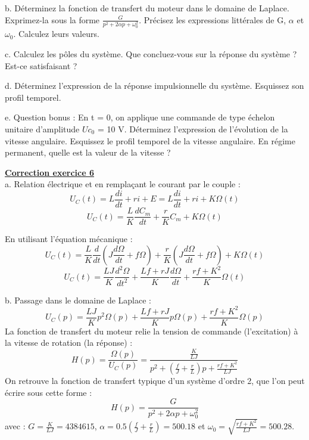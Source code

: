 \documentclass[11pt]{report}
\begin{document}
	b. Déterminez la fonction de transfert du moteur dans le domaine de Laplace. Exprimez-la sous la forme $\frac{G}{p^{2}+2\alpha p+\omega_{0}^{2}}$. Précisez les expressions littérales de G, $\alpha$ et $\omega_{0}$. Calculez leurs valeurs.
	
	c. Calculez les pôles du système. Que concluez-vous sur la réponse du système ? Est-ce satisfaisant ?
	
	d. Déterminez l'expression de la réponse impulsionnelle du système. Esquissez son profil temporel.
	
	e. Question bonus : En t = 0, on applique une commande de type échelon unitaire d'amplitude $Uc_{0}$ = 10 V. Déterminez l'expression de l'évolution de la vitesse angulaire. Esquissez le profil temporel de la vitesse angulaire. En régime permanent, quelle est la valeur de la vitesse ? 
	
	\vspace{1\baselineskip}
	
	\textbf{\underline{Correction exercice 6}}\\
	a. Relation électrique et en remplaçant le courant par le couple :
	\begin{equation*}
	U_C(t) = L\frac{di}{dt}+ri+E=L\frac{di}{dt}+ri+K\Omega(t)
	\end{equation*}
	\begin{equation*}
	U_C(t) =\frac{L}{K}\frac{dC_m}{dt}+\frac{r}{K}C_m+K\Omega(t)
	\end{equation*}
	
	En utilisant l'équation mécanique :
	\begin{equation*}
	U_C(t) =\frac{L}{K}\frac{d}{dt}(J\frac{d\Omega}{dt}+f\Omega)+\frac{r}{K}(J\frac{d\Omega}{dt}+f\Omega)+K\Omega(t)
	\end{equation*}
	\begin{equation*}
	U_C(t) =\frac{LJ}{K}\frac{d^2\Omega}{dt^2}+\frac{Lf+rJ}{K}\frac{d\Omega}{dt}+\frac{rf+K^2}{K}\Omega(t)
	\end{equation*}
	
	b. Passage dans le domaine de Laplace :
	\begin{equation*}
	U_C(p) =\frac{LJ}{K}p^2\Omega(p)+\frac{Lf+rJ}{K}p\Omega(p)+\frac{rf+K^2}{K}\Omega(p)
	\end{equation*}
	La fonction de transfert du moteur relie la tension de commande (l'excitation) à la vitesse de rotation (la réponse) :
	\begin{equation*}
	H(p)=\frac{\Omega(p)}{U_C(p)}=\frac{\frac{K}{LJ}}{p^2+(\frac{f}{J}+\frac{r}{L})p+\frac{rf+K^2}{LJ}}
	\end{equation*}
	On retrouve la fonction de transfert typique d'un système d'ordre 2, que l'on peut écrire sous cette forme :
	\begin{equation*}
	H(p)=\frac{G}{p^{2}+2\alpha p+\omega_{0}^{2}}
	\end{equation*}
	avec  : $G=\frac{K}{LJ}=4384615$, $\alpha=0.5(\frac{f}{J}+\frac{r}{L})=500.18$ et $\omega_{0}=\sqrt{\frac{rf+K^2}{LJ}}=500.28$.\\
	
\end{document}

